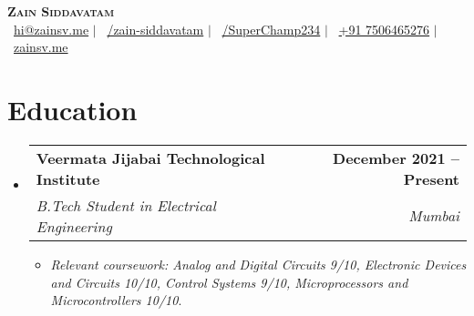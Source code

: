 \documentclass[letterpaper,11pt]{article}
\makeatletter
\newcommand{\resumeItem}[1]{
  \item\small{
    {#1 \vspace{-2pt}}
  }
}
\newcommand{\resumeSubheading}[4]{
  \vspace{-2pt}\item
    \begin{tabular*}{1.0\textwidth}[t]{l@{\extracolsep{\fill}}r}
      \textbf{#1} & \textbf{\small #2} \\
      \textit{\small#3} & \textit{\small #4} \\
    \end{tabular*}\vspace{-7pt}
}
\newcommand{\resumeSubHeadingListStart}{\begin{itemize}[leftmargin=0.0in, label={}]}
\newcommand{\resumeSubHeadingListEnd}{\end{itemize}}
\newcommand{\resumeItemListStart}{\begin{itemize}}
\newcommand{\resumeItemListEnd}{\end{itemize}\vspace{-5pt}}
\makeatother
\begin{document}
\begin{center}
  \textbf{\Huge \scshape Zain Siddavatam} \\ \vspace{1pt}
  \faEnvelope~\href{mailto:hi@zainsv.me}{hi@zainsv.me} $|$
  \faLinkedin~\href{https://www.linkedin.com/in/zain-siddavatam/}{/zain-siddavatam} $|$
  \faGithub~\href{https://github.com/SuperChamp234}{/SuperChamp234} $|$
  \faPhone~\href{tel:+917506465276}{+91 7506465276} $|$
  \faGlobe~\href{https://zainsv.me}{zainsv.me}
\end{center}

\section{Education}
\resumeSubHeadingListStart
\resumeSubheading
{Veermata Jijabai Technological Institute}{December 2021 -- Present}
{B.Tech Student in Electrical Engineering}{Mumbai}
\resumeItemListStart
\resumeItem{\textit{Relevant coursework: Analog and Digital Circuits 9/10, Electronic Devices and Circuits 10/10, Control Systems 9/10, Microprocessors and Microcontrollers 10/10}.}
\resumeItemListEnd
\resumeSubHeadingListEnd

\end{document}
